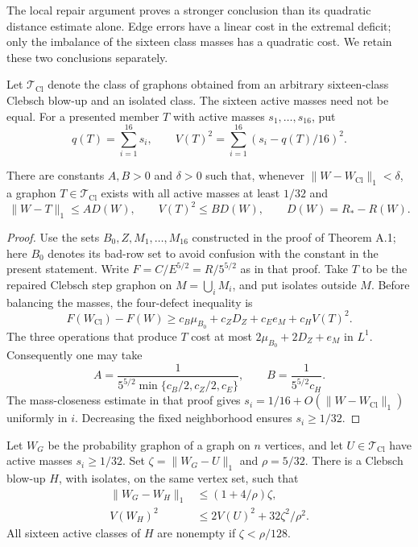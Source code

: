 The local repair argument proves a stronger conclusion than its quadratic
distance estimate alone. Edge errors have a linear cost in the extremal
deficit; only the imbalance of the sixteen class masses has a quadratic
cost. We retain these two conclusions separately.

Let $\mathcal T_{\mathrm{Cl}}$ denote the class of graphons obtained from an
arbitrary sixteen-class Clebsch blow-up and an isolated class. The sixteen
active masses need not be equal. For a presented member $T$ with active
masses $s_1,\ldots,s_{16}$, put
\[
 q(T)=\sum_{i=1}^{16}s_i,\qquad
 V(T)^2=\sum_{i=1}^{16}(s_i-q(T)/16)^2.
\]

\begin{proposition}\label{prop:two-defects}
There are constants $A,B>0$ and $\delta>0$ such that, whenever
$\|W-W_{\mathrm{Cl}}\|_1<\delta$, a graphon $T\in\mathcal T_{\mathrm{Cl}}$
exists with all active masses at least $1/32$ and
\begin{equation}\tag{44}\label{eq:44}
 \|W-T\|_1\leq AD(W),\qquad V(T)^2\leq BD(W),\qquad
 D(W)=R_\ast-R(W).
\end{equation}
\end{proposition}

\begin{proof}
Use the sets $B_0,Z,M_1,\ldots,M_{16}$ constructed in the proof of Theorem
A.1; here $B_0$ denotes its bad-row set to avoid confusion with the constant
in the present statement. Write $F=C/E^{5/2}=R/5^{5/2}$ as in that proof.
Take $T$ to be the repaired Clebsch step graphon on $M=\bigcup_i M_i$, and
put isolates outside $M$. Before balancing the masses, the four-defect
inequality is
\[
 F(W_{\mathrm{Cl}})-F(W)
 \geq c_B\mu_{B_0}+c_ZD_Z+c_Ee_M+c_HV(T)^2.
\]
The three operations that produce $T$ cost at most
$2\mu_{B_0}+2D_Z+e_M$ in $L^1$. Consequently one may take
\[
 A=\frac1{5^{5/2}\min\{c_B/2,c_Z/2,c_E\}},\qquad
 B=\frac1{5^{5/2}c_H}.
\]
The mass-closeness estimate in that proof gives
$s_i=1/16+O(\|W-W_{\mathrm{Cl}}\|_1)$ uniformly in $i$. Decreasing the
fixed neighborhood ensures $s_i\geq1/32$.
\end{proof}

\begin{lemma}\label{lem:unbalanced-rounding}
Let $W_G$ be the probability graphon of a graph on $n$ vertices, and let
$U\in\mathcal T_{\mathrm{Cl}}$ have active masses $s_i\geq1/32$. Set
$\zeta=\|W_G-U\|_1$ and $\rho=5/32$. There is a Clebsch blow-up $H$, with
isolates, on the same vertex set, such that
\begin{align}
 \|W_G-W_H\|_1&\leq(1+4/\rho)\zeta,\tag{45}\label{eq:45}\\
 V(W_H)^2&\leq2V(U)^2+32\zeta^2/\rho^2.\tag{46}\label{eq:46}
\end{align}
All sixteen active classes of $H$ are nonempty if $\zeta<\rho/128$.
\end{lemma}

